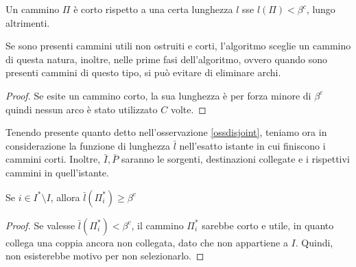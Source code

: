\begin{definition}
    Un cammino $\Pi$ è corto rispetto a una certa lunghezza $l$ sse
    $l(\Pi) < \beta^c$, lungo altrimenti.
\end{definition}
\begin{remark}
    \label{ossdisjoint}
    Se sono presenti cammini utili non ostruiti e corti, l'algoritmo sceglie un cammino
    di questa natura, inoltre, nelle prime fasi dell'algoritmo, ovvero quando sono presenti cammini
    di questo tipo, si può evitare di eliminare archi.
\end{remark}
\begin{proof}
    Se esite un cammino corto, la sua lunghezza è per forza minore di $\beta^c$ quindi nessun arco 
    è stato utilizzato $C$ volte.
\end{proof}

Tenendo presente quanto detto nell'osservazione \ref{ossdisjoint}, teniamo ora in considerazione 
la funzione di lunghezza $\bar{l}$ nell'esatto istante in cui finiscono i cammini corti.
Inoltre, $\bar{I}, \bar{P}$ saranno le sorgenti, destinazioni collegate e i rispettivi cammini 
in quell'istante.

\begin{lemma}
    \label{ldis1}
    Se $i \in I^* \setminus I$, allora $\bar{l}(\Pi_i^*) \geq \beta^c$
\end{lemma}
\begin{proof}
    Se valesse $\bar{l}(\Pi_i^*) < \beta^c$, il cammino $\Pi_i^*$ sarebbe corto e
    utile, in quanto collega una coppia ancora non collegata, dato che non appartiene a $I$.
    Quindi, non esisterebbe motivo per non selezionarlo.
\end{proof}

